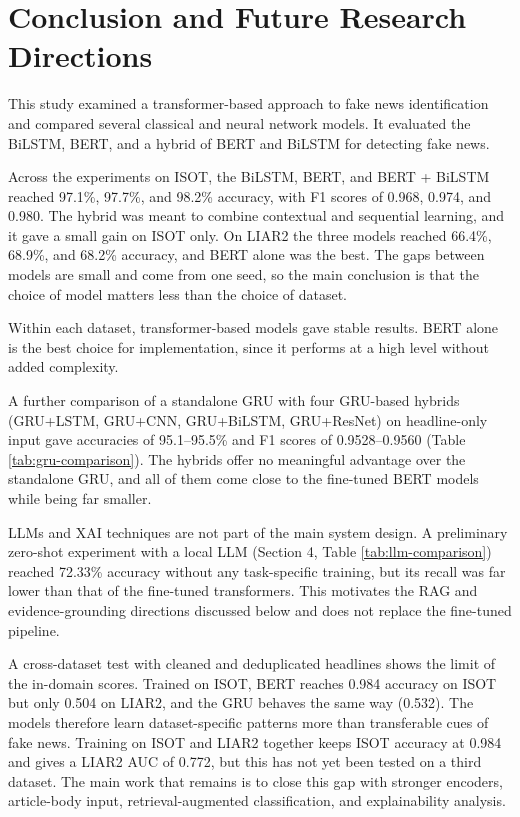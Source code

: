 \documentclass[runningheads]{llncs}
\begin{document}
\section{Conclusion and Future Research Directions}

This study examined a transformer-based approach to fake news identification and compared several classical and neural network models. It evaluated the BiLSTM, BERT, and a hybrid of BERT and BiLSTM for detecting fake news.

Across the experiments on ISOT, the BiLSTM, BERT, and BERT + BiLSTM reached 97.1\%, 97.7\%, and 98.2\% accuracy, with F1 scores of 0.968, 0.974, and 0.980. The hybrid was meant to combine contextual and sequential learning, and it gave a small gain on ISOT only. On LIAR2 the three models reached 66.4\%, 68.9\%, and 68.2\% accuracy, and BERT alone was the best. The gaps between models are small and come from one seed, so the main conclusion is that the choice of model matters less than the choice of dataset.

Within each dataset, transformer-based models gave stable results. BERT alone is the best choice for implementation, since it performs at a high level without added complexity.

A further comparison of a standalone GRU with four GRU-based hybrids (GRU+LSTM, GRU+CNN, GRU+BiLSTM, GRU+ResNet) on headline-only input gave accuracies of 95.1--95.5\% and F1 scores of 0.9528--0.9560 (Table \ref{tab:gru-comparison}). The hybrids offer no meaningful advantage over the standalone GRU, and all of them come close to the fine-tuned BERT models while being far smaller.

LLMs and XAI techniques are not part of the main system design. A preliminary zero-shot experiment with a local LLM (Section 4, Table \ref{tab:llm-comparison}) reached 72.33\% accuracy without any task-specific training, but its recall was far lower than that of the fine-tuned transformers. This motivates the RAG and evidence-grounding directions discussed below and does not replace the fine-tuned pipeline.

A cross-dataset test with cleaned and deduplicated headlines shows the limit of the in-domain scores. Trained on ISOT, BERT reaches 0.984 accuracy on ISOT but only 0.504 on LIAR2, and the GRU behaves the same way (0.532). The models therefore learn dataset-specific patterns more than transferable cues of fake news. Training on ISOT and LIAR2 together keeps ISOT accuracy at 0.984 and gives a LIAR2 AUC of 0.772, but this has not yet been tested on a third dataset. The main work that remains is to close this gap with stronger encoders, article-body input, retrieval-augmented classification, and explainability analysis.
\end{document}
